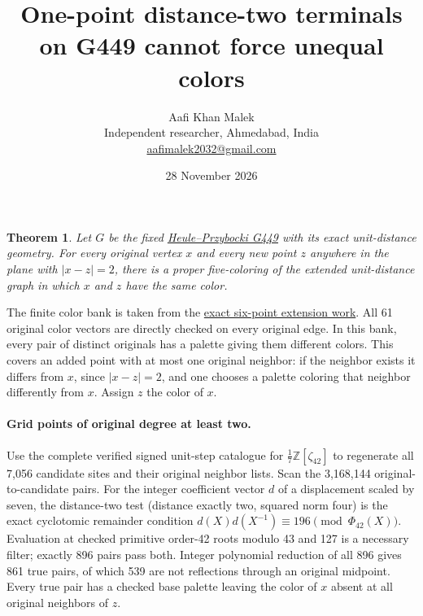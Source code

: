 \documentclass[10pt,letterpaper]{article}
\title{One-point distance-two terminals on G449 cannot force unequal colors}
\author{Aafi Khan Malek\\ \small Independent researcher, Ahmedabad, India\\
\small\href{mailto:aafimalek2032@gmail.com}{aafimalek2032@gmail.com}}
\date{28 November 2026}
\newtheorem{theorem}{Theorem}
\begin{document}
\maketitle
\begin{theorem}
Let \(G\) be the fixed
\href{https://arxiv.org/abs/2611.28518}{Heule--Przybocki G449}
with its exact unit-distance geometry. For every original vertex
\(x\) and every new point \(z\) anywhere in the plane with
\(|x-z|=2\), there is a proper five-coloring of the extended
unit-distance graph in which \(x\) and \(z\) have the same color.
\end{theorem}

The finite color bank is taken from the
\href{https://github.com/Aafimalek/novel-discoveries/tree/294c4596476e933f75703479fab2ea0f87e3723e/hadwiger-nelson/verification/g449/prime-seven-catalogue/six-point-extension-theorem}{exact six-point extension work}.
All 61 original color vectors are directly checked on every
original edge. In this bank, every pair of distinct originals
has a palette giving them different colors. This covers an
added point with at most one original neighbor: if the neighbor
exists it differs from \(x\), since \(|x-z|=2\), and one chooses
a palette coloring that neighbor differently from \(x\).
Assign \(z\) the color of \(x\).

\paragraph{Grid points of original degree at least two.}
Use the complete verified signed unit-step catalogue for
\(\tfrac17\mathbb{Z}[\zeta_{42}]\) to regenerate all 7,056
candidate sites and their original neighbor lists. Scan the
3,168,144 original-to-candidate pairs. For the integer
coefficient vector \(d\) of a displacement scaled by seven,
the distance-two test (distance exactly two, squared
norm four) is the exact cyclotomic remainder condition
\(d(X)d(X^{-1})\equiv196\pmod{\Phi_{42}(X)}\).
Evaluation at checked primitive order-42 roots modulo 43 and
127 is a necessary filter; exactly 896 pairs pass both.
Integer polynomial reduction of all 896 gives 861 true pairs,
of which 539 are not reflections through an original midpoint.
Every true pair has a checked base palette leaving the color of
\(x\) absent at all original neighbors of \(z\).
\end{document}
